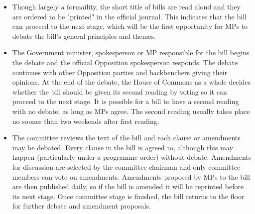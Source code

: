 \begin{itemize}

	\item {} Though largely a formaility, the short title of bills are read aloud and they are ordered to be "printed" in the official journal. This indicates that the bill can proceed to the next stage, which will be the first opportunity for MPs to debate the bill's general principles and themes.

	\item {} The Government minister, spokesperson or MP responsible for the bill begins the debate and the official Opposition spokesperson responds. The debate continues with other Opposition parties and backbenchers giving their opinions. At the end of the debate, the House of Commons as a whole decides whether the bill should be given its second reading by voting so it can proceed to the next stage. It is possible for a bill to have a second reading with no debate, as long as MPs agree. The second reading usually takes place no sooner than two weekends after first reading.

	\item {} The committee reviews the text of the bill and each clause or amendments may be debated. Every clause in the bill is agreed to, although this may happen (particularly under a programme order) without debate.	Amendments for discussion are selected by the committee chairman and only committee members can vote on amendments. Amendments proposed by MPs to the bill are then published daily, so if the bill is amended it will be reprinted before its next stage. Once committee stage is finished, the bill returns to the floor for further debate and amendment proposals.
	
	

\end{itemize}
